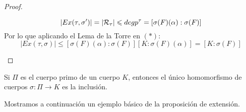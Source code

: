 \begin{prop}
\begin{proof}
\begin{itemize}
\begin{equation*}
                    |Ex(\tau, \sigma')| = |\mathcal{R}_\tau| \leqslant degp^\tau = [\sigma(F)(\alpha):\sigma(F)]
                \end{equation*}
                Por lo que aplicando el Lema de la Torre en $(\ast)$:
                \begin{equation*}
                    |Ex(\tau,\sigma)|  \leq [\sigma(F)(\alpha):\sigma(F)][K:\sigma(F)(\alpha)] = [K:\sigma(F)]
                \end{equation*}
        \end{itemize}
    \end{proof}
\end{prop}

\begin{ejercicio} 
    Si $\Pi$ es el cuerpo primo de un cuerpo $K$, entonces el único homomorfismo de cuerpos $\sigma:\Pi\to K$ es la inclusión. %
\end{ejercicio}

\noindent
Mostramos a continuación un ejemplo básico de la proposición de extensión.

